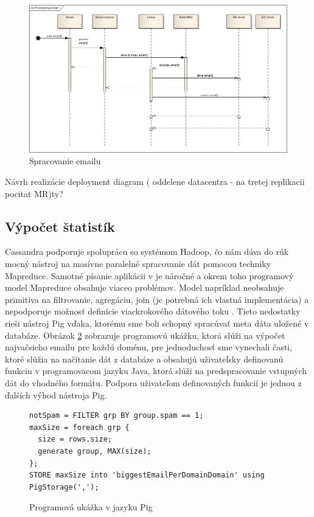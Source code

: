 \documentclass[11pt,twoside,a4paper]{book}
\begin{document}
\begin{figure}[h]
 \centering
 \includegraphics[width=16cm]{./figures/emailProcessing.png}
 \caption{Spracovanie emailu}
 \label{fig:Cseq}
\end{figure}


Návrh realizácie
deployment diagram ( oddelene datacentra - na tretej replikacii pocitat MR)ty?

\subsection{Výpočet štatistík}


Cassandra podporuje spoluprácu so systémom Hadoop, čo nám dáva do rúk mocný nástroj na masívne paralelné spracovanie dát pomocou techniky Mapreduce. Samotné písanie aplikácii v je náročné a okrem toho programový model Mapreduce obsahuje viaceo problémov. Model napríklad neobsahuje primitíva na filtrovanie, agregáciu, join (je potrebná ich vlastná implementácia) a nepodporuje možnosť definície viackrokového dátového toku \cite{Gates:2009:BHD:1687553.1687568}. Tieto nedostatky rieši nástroj Pig vďaka, ktorému sme boli schopný spracúvať meta dáta uložené v databáze. Obrázok \ref{fig:PigExample} zobrazuje programovú ukážku, ktorá slúži na výpočet najvačsieho emailu pre každú doménu, pre jednoduchosť sme vynechali časti, ktoré slúžia na načítanie dát z databáze a obsahujú uživateľsky definovanú funkciu v programovacom jazyku Java, ktorá slúži na predspracovanie vstupných dát do vhodného formátu. Podpora uživateľom definovaných funkcií je jednou z ďalších výhod nástroja Pig.

\begin{figure}[h]
\begin{verbatim}
notSpam = FILTER grp BY group.spam == 1;
maxSize = foreach grp {
  size = rows.size;
  generate group, MAX(size);
};
STORE maxSize into 'biggestEmailPerDomainDomain' using PigStorage(',');
\end{verbatim}
 \caption{Programová ukážka v jazyku Pig}
 \label{fig:PigExample}
\end{figure}  
\end{document}
